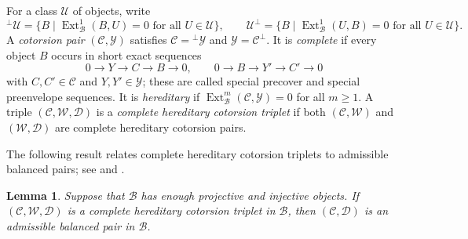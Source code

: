 \documentclass[11pt]{amsart}
\newtheorem{lemma}[theorem]{Lemma}
\theoremstyle{definition}
\theoremstyle{remark}
\theoremstyle{plain}
\numberwithin{equation}{section}
\begin{document}
For a class $\mathcal{U}$ of objects, write
\[
 {}^\perp\mathcal{U} = \{B \mid \operatorname{Ext}^1_{\mathcal{B}}(B, U) = 0\text{ for all }U \in \mathcal{U}\},
 \qquad
 \mathcal{U}^\perp = \{B \mid \operatorname{Ext}^1_{\mathcal{B}}(U, B) = 0\text{ for all }U \in \mathcal{U}\}.
\]
A \emph{cotorsion pair} $(\mathcal{C}, \mathcal{Y})$ \cite[Chapter~7]{EnochsJenda} satisfies $\mathcal{C} = {}^\perp\mathcal{Y}$ and
$\mathcal{Y} = \mathcal{C}^\perp$. It is \emph{complete} if every object $B$ occurs in short
exact sequences
\[
 0 \to Y \to C \to B \to 0, \qquad
 0 \to B \to Y' \to C' \to 0
\]
with $C, C' \in \mathcal{C}$ and $Y, Y' \in \mathcal{Y}$; these are called special precover and
special preenvelope sequences. It is \emph{hereditary} if
$\operatorname{Ext}^m_{\mathcal{B}}(\mathcal{C}, \mathcal{Y}) = 0$ for all $m \geq 1$. A triple $(\mathcal{C}, \mathcal{W}, \mathcal{D})$ is a
\emph{complete hereditary cotorsion triplet} if both $(\mathcal{C}, \mathcal{W})$ and
$(\mathcal{W}, \mathcal{D})$ are complete hereditary cotorsion pairs.

The following result relates complete hereditary cotorsion triplets to admissible balanced pairs; see \cite[Theorem~4.1]{EJTX} and \cite[Proposition~2.6]{Chen}.

\begin{lemma}\label{lem:triplet-balanced}
Suppose that $\mathcal{B}$ has enough projective and injective objects. If
$(\mathcal{C}, \mathcal{W}, \mathcal{D})$ is a complete hereditary cotorsion triplet in $\mathcal{B}$, then
$(\mathcal{C}, \mathcal{D})$ is an admissible balanced pair in $\mathcal{B}$.
\end{lemma}
\end{document}
